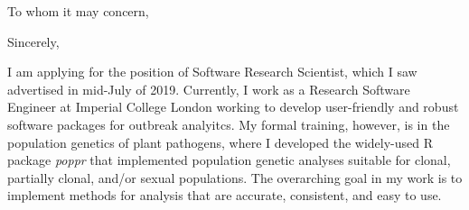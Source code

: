 


\clearpage

\date{\today} %
\opening{To whom it may concern,} %
\closing{Sincerely,} %

\makelettertitle %

I am applying for the position of Software Research Scientist, which I saw 
advertised in mid-July of 2019. Currently, I work as a Research Software
Engineer at Imperial College London working to develop user-friendly and robust
software packages for outbreak analyitcs. My formal training, however, is in
the population genetics of plant pathogens, where I developed the widely-used
R package \textit{poppr} that implemented population genetic analyses suitable
for clonal, partially clonal, and/or sexual populations. The overarching goal in
my work is to implement methods for analysis that are accurate, consistent, and
easy to use.



%
%
\makeletterclosing %




